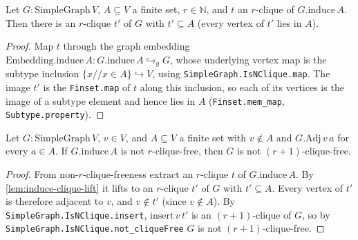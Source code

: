 \begin{lemma}
    \label{lem:induce-clique-lift}
    \leanok
    Let $G : \mathrm{SimpleGraph}\, V$, $A \subseteq V$ a finite set, $r \in \mathbb{N}$,
    and $t$ an $r$-clique of $G.\mathrm{induce}\, A$. Then there is an $r$-clique
    $t'$ of $G$ with $t' \subseteq A$ (every vertex of $t'$ lies in $A$).
\end{lemma}
\begin{proof}
    Map $t$ through the graph embedding
    $\mathrm{Embedding.induce}\, A : G.\mathrm{induce}\, A \hookrightarrow_g G$,
    whose underlying vertex map is the subtype inclusion
    $\{x \mathbin{//} x \in A\} \hookrightarrow V$, using
    \texttt{SimpleGraph.IsNClique.map}. The image $t'$ is the \texttt{Finset.map} of
    $t$ along this inclusion, so each of its vertices is the image of a subtype
    element and hence lies in $A$ (\texttt{Finset.mem\_map}, \texttt{Subtype.property}).
\end{proof}

\begin{lemma}
    \label{lem:common-neighbor}
    \leanok
    Let $G : \mathrm{SimpleGraph}\, V$, $v \in V$, and $A \subseteq V$ a finite set
    with $v \notin A$ and $G.\mathrm{Adj}\, v\, a$ for every $a \in A$. If
    $G.\mathrm{induce}\, A$ is not $r$-clique-free, then $G$ is not
    $(r{+}1)$-clique-free.
\end{lemma}
\begin{proof}
    From non-$r$-clique-freeness extract an $r$-clique $t$ of $G.\mathrm{induce}\,A$.
    By \cref{lem:induce-clique-lift} it lifts to an $r$-clique $t'$ of $G$ with
    $t' \subseteq A$. Every vertex of $t'$ is therefore adjacent to $v$, and
    $v \notin t'$ (since $v \notin A$). By \texttt{SimpleGraph.IsNClique.insert},
    $\mathrm{insert}\, v\, t'$ is an $(r{+}1)$-clique of $G$, so by
    \texttt{SimpleGraph.IsNClique.not\_cliqueFree} $G$ is not $(r{+}1)$-clique-free.
\end{proof}

